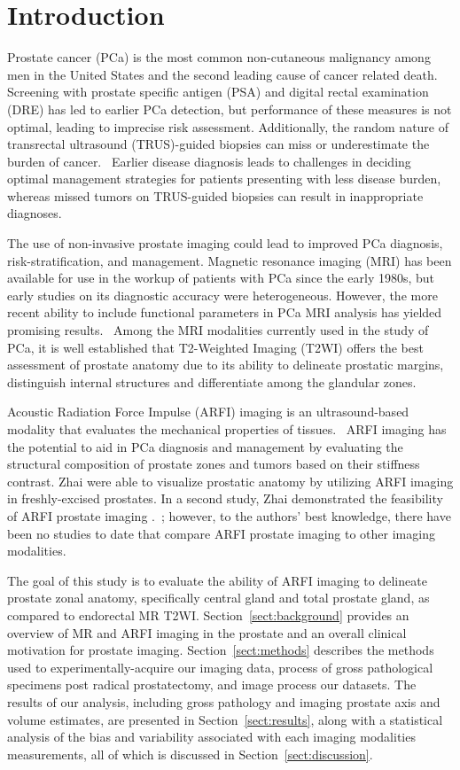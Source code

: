 \section{Introduction}\label{sect:intro}
Prostate cancer (PCa) is the most common non-cutaneous malignancy among men in
the United States and the second leading cause of cancer related
death.~\cite{Howlader2011} Screening with prostate specific antigen (PSA) and
digital rectal examination (DRE) has led to earlier PCa detection, but
performance of these measures is not optimal, leading to imprecise risk
assessment.  Additionally, the random nature of transrectal ultrasound
(TRUS)-guided biopsies can miss or underestimate the burden of
cancer.~\cite{Gupta2013} Earlier disease diagnosis leads to challenges in
deciding optimal management strategies for patients presenting with less
disease burden, whereas missed tumors on TRUS-guided biopsies can result in
inappropriate diagnoses. 

The use of non-invasive prostate imaging could lead to improved PCa diagnosis,
risk-stratification, and management.  Magnetic resonance imaging (MRI) has been
available for use in the workup of patients with PCa since the early 1980s, but
early studies on its diagnostic accuracy were heterogeneous.  However, the more
recent ability to include functional parameters in PCa MRI analysis has yielded
promising results.~\cite{Gupta2013,Hricak2007} Among the MRI modalities
currently used in the study of PCa, it is well established that T2-Weighted
Imaging (T2WI) offers the best assessment of prostate anatomy due to its
ability to delineate prostatic margins, distinguish internal structures and
differentiate among the glandular zones. 

Acoustic Radiation Force Impulse (ARFI) imaging is an ultrasound-based modality
that evaluates the mechanical properties of tissues.~\cite{Nightingale2002b}
ARFI imaging has the potential to aid in PCa diagnosis and management by
evaluating the structural composition of prostate zones and tumors based on
their stiffness contrast.  Zhai \etal were able to visualize prostatic anatomy
by utilizing ARFI imaging in freshly-excised prostates. In a second study, Zhai
\etal demonstrated the feasibility of ARFI prostate imaging
\invivo.~\cite{Zhai2012}; however, to the authors’ best knowledge, there have
been no studies to date that compare \invivo ARFI prostate imaging to other
imaging modalities.~\cite{Zhai2010} 

The goal of this study is to evaluate the ability of ARFI imaging to delineate
prostate zonal anatomy, specifically central gland and total prostate gland,
\invivo as compared to endorectal MR T2WI.  Section~\ref{sect:background}
provides an overview of MR and ARFI imaging in the prostate and an overall
clinical motivation for prostate imaging.  Section~\ref{sect:methods} describes
the methods used to experimentally-acquire our imaging data, process of gross
pathological specimens post radical prostatectomy, and image process our
datasets.  The results of our analysis, including gross pathology and imaging
prostate axis and volume estimates, are presented in
Section~\ref{sect:results}, along with a statistical analysis of the bias and
variability associated with each imaging modalities measurements, all of which
is discussed in Section~\ref{sect:discussion}.
